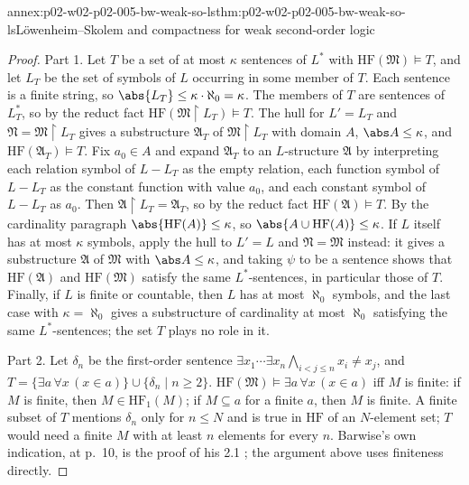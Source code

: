 \begin{annexitem}{annex:p02-w02-p02-005-bw-weak-so-ls}{thm:p02-w02-p02-005-bw-weak-so-ls}{L\"owenheim--Skolem and compactness for weak second-order logic}
\begin{proof}
Part 1.  Let \(T\) be a set of at most \(\kappa\) sentences of \(L^{*}\)
with \(\mathrm{HF}(\mathfrak M)\models T\), and let \(L_T\) be the set of
symbols of \(L\) occurring in some member of \(T\).  Each sentence is a
finite string, so \(\abs{L_T}\leq\kappa\cdot\aleph_0=\kappa\).  The members
of \(T\) are sentences of \(L_T^{*}\), so by the reduct fact
\(\mathrm{HF}(\mathfrak M\restriction L_T)\models T\).  The hull for
\(L'=L_T\) and \(\mathfrak N=\mathfrak M\restriction L_T\) gives a
substructure \(\mathfrak A_T\) of \(\mathfrak M\restriction L_T\) with
domain \(A\), \(\abs A\leq\kappa\), and
\(\mathrm{HF}(\mathfrak A_T)\models T\).  Fix \(a_0\in A\) and expand
\(\mathfrak A_T\) to an \(L\)-structure \(\mathfrak A\) by interpreting each
relation symbol of \(L-L_T\) as the empty relation, each function symbol
of \(L-L_T\) as the constant function with value \(a_0\), and each constant
symbol of \(L-L_T\) as \(a_0\).  Then \(\mathfrak A\restriction L_T=
\mathfrak A_T\), so by the reduct fact \(\mathrm{HF}(\mathfrak A)\models T\).
By the cardinality paragraph \(\abs{\mathrm{HF}(A)}\leq\kappa\), so
\(\abs{A\cup\mathrm{HF}(A)}\leq\kappa\).  If \(L\) itself has at most
\(\kappa\) symbols, apply the hull to \(L'=L\) and \(\mathfrak N=\mathfrak M\)
instead: it gives a substructure \(\mathfrak A\) of \(\mathfrak M\) with
\(\abs A\leq\kappa\), and taking \(\psi\) to be a sentence shows that
\(\mathrm{HF}(\mathfrak A)\) and \(\mathrm{HF}(\mathfrak M)\) satisfy the
same \(L^{*}\)-sentences, in particular those of \(T\).  Finally, if \(L\)
is finite or countable, then \(L\) has at most \(\aleph_0\) symbols, and
the last case with \(\kappa=\aleph_0\) gives a substructure of cardinality
at most \(\aleph_0\) satisfying the same \(L^{*}\)-sentences; the set
\(T\) plays no role in it.

Part 2.  Let \(\delta_n\) be the first-order sentence
\(\exists x_1\cdots\exists x_n\bigwedge_{i<j\leq n}x_i\neq x_j\), and
\(T=\{\exists a\,\forall x\,(x\in a)\}\cup\{\delta_n\mid n\geq2\}\).
\(\mathrm{HF}(\mathfrak M)\models\exists a\,\forall x\,(x\in a)\) iff \(M\)
is finite: if \(M\) is finite, then \(M\in\mathrm{HF}_1(M)\); if \(M\subseteq a\)
for a finite \(a\), then \(M\) is finite.  A finite subset of \(T\) mentions
\(\delta_n\) only for \(n\leq N\) and is true in \(\mathrm{HF}\) of an
\(N\)-element set; \(T\) would need a finite \(M\) with at least \(n\)
elements for every \(n\).  Barwise's own indication, at p.~10, is the proof
of his 2.1 \cite[ch.~A.1, \S2, p.~10]{Barwise1977FirstOrder}; the argument
above uses finiteness directly.
\end{proof}
\end{annexitem}

